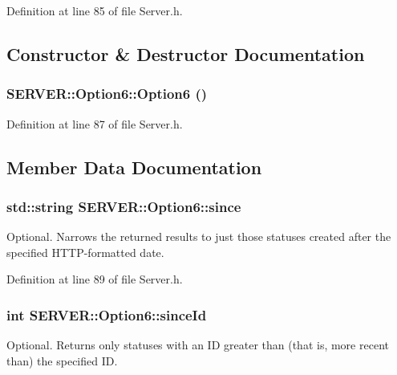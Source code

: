 Definition at line 85 of file Server.h.

\subsection{Constructor \& Destructor Documentation}
\hypertarget{structSERVER_1_1Option6_ee28e2e135930a50d7ecb1cdcffe2eb3}{
\subsubsection{\setlength{\rightskip}{0pt plus 5cm}SERVER::Option6::Option6 ()}}
\label{structSERVER_1_1Option6_ee28e2e135930a50d7ecb1cdcffe2eb3}




Definition at line 87 of file Server.h.

\subsection{Member Data Documentation}
\hypertarget{structSERVER_1_1Option6_ec7f2a09a7535b3fc74e9f86b922631f}{
\subsubsection{\setlength{\rightskip}{0pt plus 5cm}std::string {\bf SERVER::Option6::since}}}
\label{structSERVER_1_1Option6_ec7f2a09a7535b3fc74e9f86b922631f}


Optional. Narrows the returned results to just those statuses created after the specified HTTP-formatted date. 



Definition at line 89 of file Server.h.\hypertarget{structSERVER_1_1Option6_f2fde04299eea0db7e9bc50235bf3465}{
\subsubsection{\setlength{\rightskip}{0pt plus 5cm}int {\bf SERVER::Option6::sinceId}}}
\label{structSERVER_1_1Option6_f2fde04299eea0db7e9bc50235bf3465}


Optional. Returns only statuses with an ID greater than (that is, more recent than) the specified ID. 



